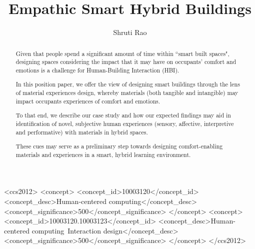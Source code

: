 \documentclass[manuscript, anonymous, review]{acmart}
\begin{document}
\title{Empathic Smart Hybrid Buildings}

\author{Shruti Rao}



\renewcommand{\shortauthors}{Rao et al.}

\begin{abstract}
Given that people spend a significant amount of time within ``smart built spaces", designing spaces considering the impact that it may have on occupants’ comfort and emotions is a challenge for Human-Building Interaction (HBI).

In this position paper, we offer the view of designing smart buildings through the lens of material experiences design, whereby materials (both tangible and intangible) may impact occupants experiences of comfort and emotions.

To that end, we describe our case study and how our expected findings may aid in identification of novel, subjective human experiences (sensory, affective, interpretive and performative) with materials in hybrid spaces.

These cues may serve as a preliminary step towards designing comfort-enabling materials  and experiences in a smart, hybrid learning environment. 
\end{abstract}


\begin{CCSXML}
<ccs2012>
   <concept>
       <concept_id>10003120</concept_id>
       <concept_desc>Human-centered computing</concept_desc>
       <concept_significance>500</concept_significance>
       </concept>
   <concept>
       <concept_id>10003120.10003123</concept_id>
       <concept_desc>Human-centered computing~Interaction design</concept_desc>
       <concept_significance>500</concept_significance>
       </concept>
 </ccs2012>
\end{CCSXML}
\end{document}
